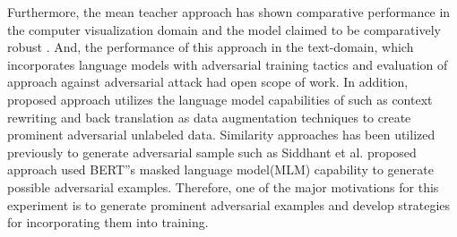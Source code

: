 \documentclass[%
	BCOR=8mm, %
	DIV=12,
	toc=bibliography, %
	toc=listof, %
	oneside, %
	egregdoesnotlikesansseriftitles, %
	]{scrbook}
\begin{document}
Furthermore, the mean teacher approach has shown comparative performance in the computer visualization domain and the model claimed to be comparatively robust \cite{tarvainen_mean_2018}. And, the performance of this approach in the text-domain, which incorporates language models with adversarial training tactics  and evaluation of approach against adversarial attack had open scope of work. In addition, proposed approach utilizes the language model capabilities of such as context rewriting and back translation as data augmentation techniques to create prominent adversarial unlabeled data. Similarity approaches has been utilized previously to generate adversarial sample such as  Siddhant et al.  \cite{garg_bae_2020}  proposed approach used BERT''s masked language model(MLM) capability to generate possible adversarial examples. Therefore, one of the major motivations for this experiment is to generate prominent adversarial examples and develop strategies for incorporating them into training.
\end{document}
